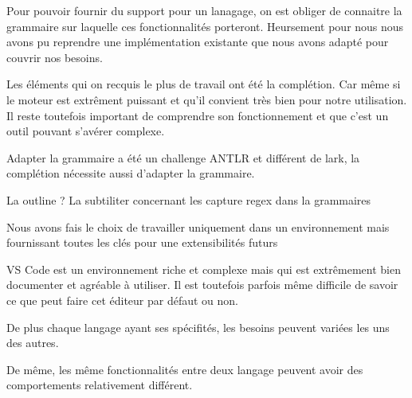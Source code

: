 \documentclass[
    iict, %
    il, %
]{heig-tb}
\begin{document}








Pour pouvoir fournir du support pour un lanagage, on est obliger de connaitre la grammaire sur laquelle ces fonctionnalités porteront.
Heursement pour nous nous avons pu reprendre une implémentation existante que nous avons adapté pour couvrir nos besoins.


Les éléments qui on recquis le plus de travail ont été la complétion.
Car même si le moteur est extrêment puissant et qu'il convient très bien pour notre utilisation. Il reste toutefois important de comprendre son fonctionnement et que c'est un outil pouvant s'avérer complexe.

Adapter la grammaire a été un challenge ANTLR et différent de lark, la complétion nécessite aussi d'adapter la grammaire.

La outline ?
La subtiliter concernant les capture regex dans la grammaires

Nous avons fais le choix de travailler uniquement dans un environnement mais fournissant toutes les clés pour une extensibilités futurs

VS Code est un environnement riche et complexe mais qui est extrêmement bien documenter et agréable à utiliser.
Il est toutefois parfois même difficile de savoir ce que peut faire cet éditeur par défaut ou non.




De plus chaque langage ayant ses spécifités, les besoins peuvent variées les uns des autres.

De même, les même fonctionnalités entre deux langage peuvent avoir des comportements relativement différent.
\end{document}
